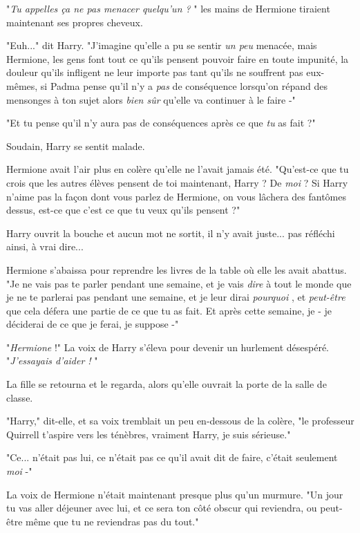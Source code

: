 "\emph{Tu appelles ça ne pas menacer quelqu'un ?} " les mains de Hermione tiraient maintenant ses propres cheveux.

"Euh..." dit Harry. "J'imagine qu'elle a pu se sentir \emph{un peu}  menacée, mais Hermione, les gens font tout ce qu'ils pensent pouvoir faire en toute impunité, la douleur qu'ils infligent ne leur importe pas tant qu'ils ne souffrent pas eux-mêmes, si Padma pense qu'il n'y a \emph{pas}  de conséquence lorsqu'on répand des mensonges à ton sujet alors \emph{bien sûr}  qu'elle va continuer à le faire -"

"Et tu pense qu'il n'y aura pas de conséquences après ce que \emph{tu}  as fait ?"

Soudain, Harry se sentit malade.

Hermione avait l'air plus en colère qu'elle ne l'avait jamais été. "Qu'est-ce que tu crois que les autres élèves pensent de toi maintenant, Harry ? De \emph{moi } ? Si Harry n'aime pas la façon dont vous parlez de Hermione, on vous lâchera des fantômes dessus, est-ce que c'est ce que tu veux qu'ils pensent ?"

Harry ouvrit la bouche et aucun mot ne sortit, il n'y avait juste... pas réfléchi ainsi, à vrai dire...

Hermione s'abaissa pour reprendre les livres de la table où elle les avait abattus. "Je ne vais pas te parler pendant une semaine, et je vais \emph{dire}  à tout le monde que je ne te parlerai pas pendant une semaine, et je leur dirai \emph{pourquoi} , et \emph{peut-être}  que cela défera une partie de ce que tu as fait. Et après cette semaine, je - je déciderai de ce que je ferai, je suppose -"

"\emph{Hermione}  !" La voix de Harry s'éleva pour devenir un hurlement désespéré. "\emph{J'essayais d'aider !} "

La fille se retourna et le regarda, alors qu'elle ouvrait la porte de la salle de classe.

"Harry," dit-elle, et sa voix tremblait un peu en-dessous de la colère, "le professeur Quirrell t'aspire vers les ténèbres, vraiment Harry, je suis sérieuse."

"Ce... n'était pas lui, ce n'était pas ce qu'il avait dit de faire, c'était seulement \emph{moi}  -"

La voix de Hermione n'était maintenant presque plus qu'un murmure. "Un jour tu vas aller déjeuner avec lui, et ce sera ton côté obscur qui reviendra, ou peut-être même que tu ne reviendras pas du tout."

